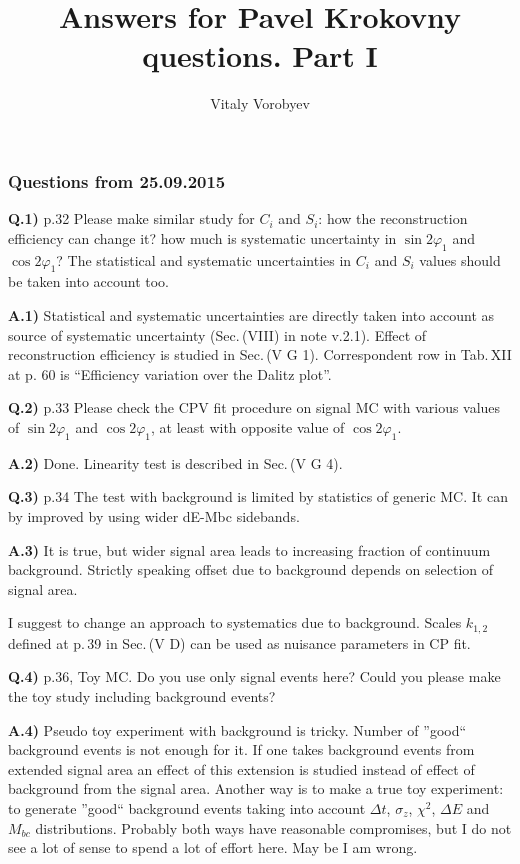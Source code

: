 \documentclass[a4paper,12pt]{article}
\title{Answers for Pavel Krokovny questions. Part I}
\author{Vitaly Vorobyev}
\begin{document}
\maketitle

\subsubsection*{Questions from 25.09.2015}
{\bf Q.1)} p.32 Please make similar study for $C_i$ and $S_i$: how the reconstruction efficiency can change it? how much is systematic uncertainty in $\sin{2\varphi_1}$ and $\cos{2\varphi_1}$? The statistical and systematic uncertainties in $C_i$ and $S_i$ values should be taken into account too.

{\bf A.1)} Statistical and systematic uncertainties are directly taken into account as source of systematic uncertainty (Sec.\,(VIII) in note v.2.1). Effect of reconstruction efficiency is studied in Sec.\,(V G 1). Correspondent row in Tab.\,XII at p. 60 is ``Efficiency variation over the Dalitz plot''.

{\bf Q.2)} p.33 Please check the CPV fit procedure on signal MC with various values of $\sin{2\varphi_1}$ and $\cos{2\varphi_1}$, at least with opposite value of $\cos{2\varphi_1}$.

{\bf A.2)} Done. Linearity test is described in Sec.\,(V G 4).

{\bf Q.3)} p.34 The test with background is limited by statistics of generic MC. It can by improved by using wider dE-Mbc sidebands.

{\bf A.3)} It is true, but wider signal area leads to increasing fraction of continuum background. Strictly speaking offset due to background depends on selection of signal area.

I suggest to change an approach to systematics due to background. Scales $k_{1,2}$ defined at p.\,39 in Sec.\,(V D) can be used as nuisance parameters in CP fit.

{\bf Q.4)} p.36, Toy MC. Do you use only signal events here? Could you please make the toy study including background events?

{\bf A.4)} Pseudo toy experiment with background is tricky. Number of ''good`` background events is not enough for it. If one takes background events from extended signal area an effect of this extension is studied instead of effect of background from the signal area. Another way is to make a true toy experiment: to generate ''good`` background events taking into account $\Delta t$, $\sigma_z$, $\chi^2$, $\Delta E$ and $M_{bc}$ distributions. Probably both ways have reasonable compromises, but I do not see a lot of sense to spend a lot of effort here. May be I am wrong.
\end{document}
